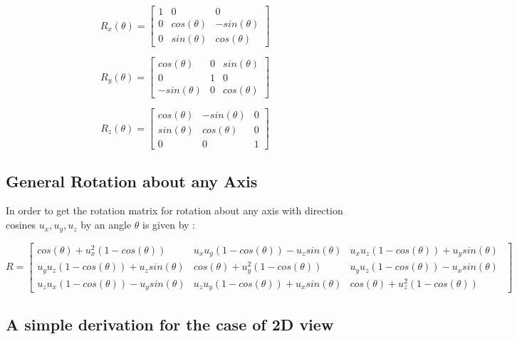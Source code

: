 \documentclass[12pt]{report}
\begin{document}

\[ R_{x}(\theta) = \begin{bmatrix}
1 & 0 & 0 \\
0 & cos(\theta) & -sin(\theta) \\
0 & sin(\theta) & cos(\theta) 
\end{bmatrix} \]

\[ R_{y}(\theta) = \begin{bmatrix}
cos(\theta) & 0 & sin(\theta) \\
0 & 1 & 0 \\
-sin(\theta) & 0 & cos(\theta) 
\end{bmatrix} \]

\[ R_{z}(\theta) = \begin{bmatrix}
cos(\theta) & -sin(\theta) & 0 \\
sin(\theta) & cos(\theta) & 0 \\
0 & 0 & 1 
\end{bmatrix} \]



\subsection{General Rotation about any Axis}


In order to get the rotation matrix for rotation about any axis with direction cosines $ u_{x}, u_{y},u_{z}  $ by an angle $\theta$ is given by : 
\begin{changemargin}{-1.2cm}{0cm} 
\[ R =  \begin{bmatrix}
cos(\theta) + u_{x}^2(1-cos(\theta)) & u_{x}u_{y}(1-cos(\theta)) - u_{z}sin(\theta) &  u_{x}u_{z}(1-cos(\theta)) + u_{y}sin(\theta) \\
u_{y}u_{z}(1-cos(\theta)) + u_{z}sin(\theta) & cos(\theta) + u_{y}^2(1-cos(\theta)) &  u_{y}u_{z}(1-cos(\theta)) - u_{x}sin(\theta) \\
u_{z}u_{x}(1-cos(\theta)) - u_{y}sin(\theta) & u_{z}u_{y}(1-cos(\theta)) + u_{x}sin(\theta) & cos(\theta) + u_{z}^2(1-cos(\theta)) 
\hspace{1cm}
\end{bmatrix}\]
\end{changemargin}

\subsection{A simple derivation for the case of 2D view}
\end{document}
